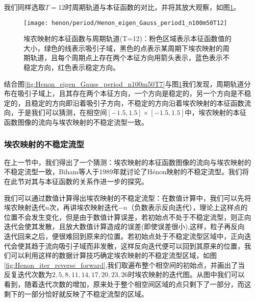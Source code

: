 我们同样选取$T=12$时周期轨道与本征函数的对比，并将其放大观察，如图\ref{fig:Henon_eigen_Gauss_period1_n100m50T12}。
\begin{figure}
	\centering
	\texttt{[image: henon/period/Henon\_eigen\_Gauss\_period1\_n100m50T12]}
    \caption[埃农映射的本征函数与周期轨道]{埃农映射的本征函数与周期轨道(T=12)：粉色区域表示本征函数值的大小，绿色的线表示吸引子域，黑色的点表示某周期下埃农映射的周期轨道，且每个周期点上存在两个本征方向用箭头表示，蓝色表示不稳定方向，红色表示稳定方向。}\label{fig:Henon_eigen_Gauss_period1_n100m50T12}
\end{figure}
结合图\ref{fig:Henon_eigen_Gauss_period_n100m50T7}与图\ref{fig:Henon_eigen_Gauss_period1_n100m50T12}我们发现，周期轨道分布在吸引子域上，且其存在两个本征方向，一个方向是稳定的，另一个方向是不稳定的，且稳定的方向即沿着吸引子方向，不稳定的方向沿着埃农映射的本征函数流向，于是我们可以猜测，在相空间$[-1.5,1.5]\times [-1.5,1.5]$中，埃农映射的本征函数图像的流向与埃农映射的不稳定流型一致。

\subsubsection{埃农映射的不稳定流型}
在上一节中，我们得出了一个猜测：埃农映射的本征函数图像的流向与埃农映射的不稳定流型一致，Biham等人于1989年就讨论了H\'{e}non映射的不稳定流型\cite{biham1989characterization}。我们将在此节对其与本征函数的关系作进一步的探究。

我们可以通过数值计算得出埃农映射的不稳定流型：在数值计算中，我们可以先将埃农映射迭代$n$次，再讲埃农映射迭代$-n$（负数表示反向迭代），理论上这样点的位置不会发生变化，但是由于数值计算误差，若初始点不处于不稳定流型，则正向迭代会使其发散，且放大数值计算造成的误差(即使误差很小),这样，粒子再反向迭代回来之后，便很难回到原来的位置。若初始点处于不稳定流型区域中，正向迭代会使其趋于流向吸引子域而非发散，这样反向迭代便可以回到其原来的位置，我们可以利用这样的数据计算技巧确定埃农映射的不稳定流型区域，如图\ref{fig:Henon_iter_reverse_forward},我们取遍布整个相空间的初始点，并画出了当反复迭代次数为$2,5,8,11,14,17,20,23,26$时埃农映射的迭代图。从图中我们可以看到，随着迭代次数的增加，原来处于整个相空间区域的点只剩下了一部分，而这剩下的一部分恰好就反映了不稳定流型的区域。

